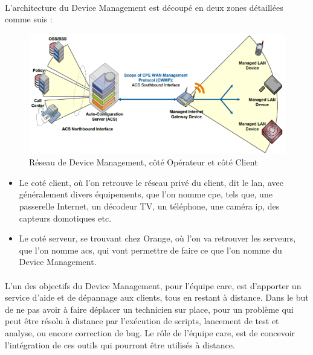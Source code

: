 \documentclass[12pt,a4paper]{report}
\begin{document}
\paragraph*{}
L'architecture du Device Management est découpé en deux zones détaillées comme suis : 
\begin{figure}[!ht]
    \center
    \includegraphics[scale=0.7]{./img/DM-TR-069-screen.png}
    \caption{Réseau de Device Management, côté Opérateur et côté Client}
\end{figure}
\begin{itemize}
\subparagraph*{}
\item Le coté client, où l'on retrouve le réseau privé du client, dit le \gls{lan}, avec généralement divers équipements, que l'on nomme \gls{cpe}, tels que, une passerelle Internet, un décodeur TV, un téléphone, une caméra \gls{ip}, des capteurs domotiques etc.
\item Le coté serveur, se trouvant chez Orange, où l'on va retrouver les serveurs, que l'on nomme \gls{acs}, qui vont permettre de faire ce que l'on nomme du Device Management.
\end{itemize}
\paragraph*{}
L’un des objectifs du Device Management, pour l’équipe \gls{care}, est d’apporter un service d’aide et de dépannage aux clients, tous en restant à distance. Dans le but de ne pas avoir à faire déplacer un technicien sur place, pour un problème qui peut être résolu à distance par l’exécution de scripts, lancement de test et analyse, ou encore correction de bug. Le rôle de l’équipe \gls{care}, est de concevoir l’intégration de ces outils qui pourront être utilisés à distance.
\end{document}
